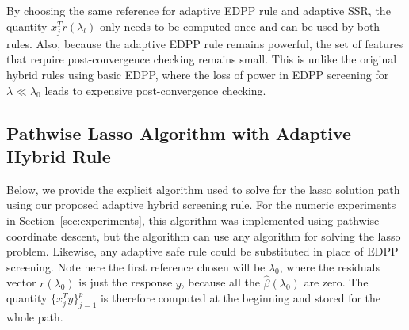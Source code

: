 By choosing the same reference for adaptive EDPP rule and adaptive SSR, the quantity $x_j^Tr(\lambda_l)$ only needs to be computed once and can be used by both rules. Also, because the adaptive EDPP rule remains powerful, the set of features that require post-convergence checking remains small.  This is unlike the original hybrid rules using basic EDPP, where the loss of power in EDPP screening for $\lambda \ll \lambda_0$ leads to expensive post-convergence checking.

\subsection{Pathwise Lasso Algorithm with Adaptive Hybrid Rule}

Below, we provide the explicit algorithm used to solve for the lasso solution path using our proposed adaptive hybrid screening rule. For the numeric experiments in Section~\ref{sec:experiments}, this algorithm was implemented using pathwise coordinate descent, but the algorithm can use any algorithm for solving the lasso problem.  Likewise, any adaptive safe rule could be substituted in place of EDPP screening.  Note here the first reference chosen will be $\lambda_0$, where the residuals vector $r(\lambda_0)$ is just the response $y$, because all the $\hat{\beta}(\lambda_0)$ are zero. The quantity $\{x_j^Ty\}_{j=1}^p$ is therefore computed at the beginning and stored for the whole path.

